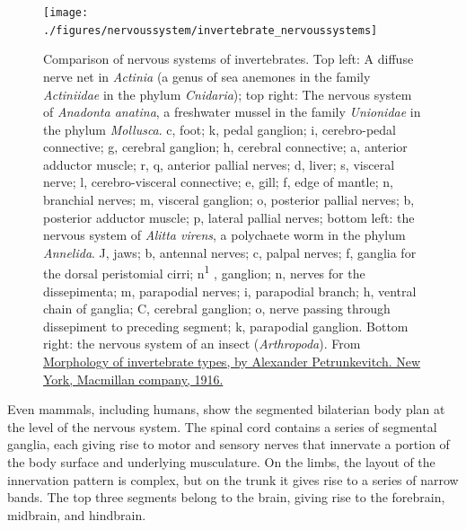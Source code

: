 \begin{figure}

{\centering \texttt{[image: ./figures/nervoussystem/invertebrate\_nervoussystems]} 

}

\caption{Comparison of nervous systems of invertebrates. Top left: A diffuse nerve net in \emph{Actinia} (a genus of sea anemones in the family \emph{Actiniidae} in the phylum \emph{Cnidaria}); top right: The nervous system of \emph{Anadonta anatina}, a freshwater mussel in the family \emph{Unionidae} in the phylum \emph{Mollusca}. c, foot; k, pedal ganglion; i, cerebro-pedal connective; g, cerebral ganglion; h, cerebral connective; a, anterior adductor muscle; r, q, anterior pallial nerves; d, liver; s, visceral nerve; l, cerebro-visceral connective; e, gill; f, edge of mantle; n, branchial nerves; m, visceral ganglion; o, posterior pallial nerves; b, posterior adductor muscle; p, lateral pallial nerves; bottom left: the nervous system of \emph{Alitta virens}, a polychaete worm in the phylum \emph{Annelida}. J, jaws; b, antennal nerves; c, palpal nerves; f, ganglia for the dorsal peristomial cirri; n\textsuperscript{1} , ganglion; n, nerves for the dissepimenta; m, parapodial nerves; i, parapodial branch; h, ventral chain of ganglia; C, cerebral ganglion; o, nerve passing through dissepiment to preceding segment; k, parapodial ganglion. Bottom right: the nervous system of an insect (\emph{Arthropoda}). From \href{https://www.biodiversitylibrary.org/ia/morphologyofinve00petr\#page/7/mode/1up}{Morphology of invertebrate types, by Alexander Petrunkevitch. New York, Macmillan company, 1916.}}\label{fig:invertebratenervoussystem}
\end{figure}

Even mammals, including humans, show the segmented bilaterian body plan at the level of the nervous system. The spinal cord contains a series of segmental ganglia, each giving rise to motor and sensory nerves that innervate a portion of the body surface and underlying musculature. On the limbs, the layout of the innervation pattern is complex, but on the trunk it gives rise to a series of narrow bands. The top three segments belong to the brain, giving rise to the forebrain, midbrain, and hindbrain.

